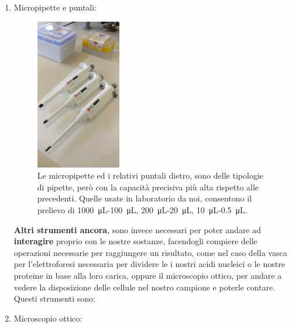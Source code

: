 \documentclass{article}
\begin{document}
\begin{enumerate}
\begin{figure}[H]
		\end{figure}

		\vspace{0.5cm}


		\item Micropipette e puntali:

		\begin{figure}[H]

			\includegraphics[width=0.35\textwidth]{./immagini/micropipette.jpg}
			\caption{Le micropipette ed i relativi puntali dietro, sono delle tipologie di pipette, però con la capacità precisiva più alta rispetto alle precedenti. Quelle usate in laboratorio da noi, consentono il prelievo di
			\SI{1000}{\micro\liter}-\SI{100}{\micro\liter}, \SI{200}{\micro\liter}-\SI{20}{\micro\liter},
			\SI{10}{\micro\liter}-\SI{0.5}{\micro\liter}. }
			\label{micropipette}

		\end{figure}

		\vspace{0.5cm}

		\textbf{Altri strumenti ancora}, sono invece necessari per poter andare ad \textbf{interagire} proprio con le nostre sostanze, facendogli compiere delle operazioni necessarie per raggiungere un risultato, come nel caso della vasca per l'elettroforesi necessaria per dividere le i nostri acidi nucleici o le nostre proteine in base alla loro carica, oppure il microscopio ottico, per andare a vedere la disposizione delle cellule nel nostro campione e poterle contare.
Questi strumenti sono:




		\item Microscopio ottico:

		\begin{figure}[H]


\end{figure}
\end{enumerate}
\end{document}
